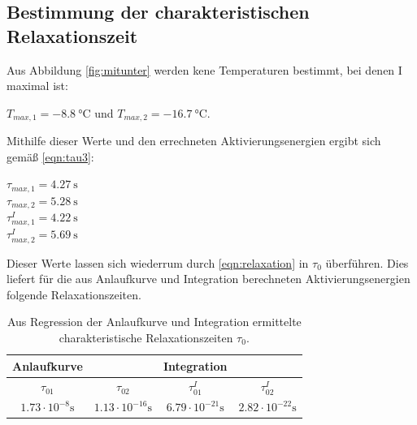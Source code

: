 \subsection{Bestimmung der charakteristischen Relaxationszeit}
Aus Abbildung \ref{fig:mitunter} werden kene Temperaturen bestimmt, bei denen I maximal ist:
\begin{center}
  $T_{max,1} = \SI{-8.8}{\celsius}$ und $T_{max,2} = \SI{-16.7}{\celsius}$.
\end{center}
Mithilfe dieser Werte und den errechneten Aktivierungsenergien ergibt sich gemäß \eqref{eqn:tau3}:
\begin{center}
  $\tau_{max,1}   = \SI{4.27}{\second}$\\ $\tau_{max,2}   = \SI{5.28}{\second}$\\
  $\tau_{max,1}^I = \SI{4.22}{\second}$\\
  $\tau_{max,2}^I = \SI{5.69}{\second}$
\end{center}
Dieser Werte lassen sich wiederrum durch \eqref{eqn:relaxation} in $\tau_0$ überführen.
Dies liefert für die aus Anlaufkurve und Integration berechneten Aktivierungsenergien folgende Relaxationszeiten.
\begin{table}[H]
  \centering
  \caption{Aus Regression der Anlaufkurve und Integration ermittelte charakteristische Relaxationszeiten $\tau_0$.}
  \label{tab:relax}
  \begin{tabular}{c|c|c|c}
    Anlaufkurve&&Integration&\\
    \hline
    $\tau_{01}$ & $\tau_{02}$ & $\tau_{01}^I$ & $\tau_{02}^I$\\
    \hline
    $1.73\cdot 10^{-8}\si{\second}$ & $1.13\cdot 10^{-16}\si{\second}$ & $6.79\cdot 10^{-21}\si{\second}$ & $2.82\cdot 10^{-22}\si{\second}$\\
  \end{tabular}
\end{table}
